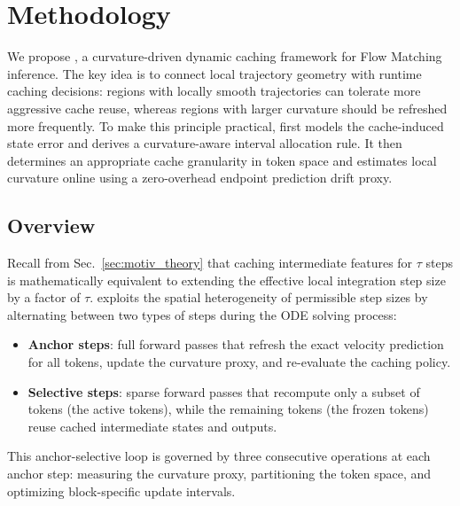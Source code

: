\section{Methodology}
\label{sec:method}

We propose \cubic, a curvature-driven dynamic caching framework for
Flow Matching inference. The key idea is to connect local trajectory
geometry with runtime caching decisions: regions with locally smooth
trajectories can tolerate more aggressive cache reuse, whereas regions
with larger curvature should be refreshed more frequently. To make this
principle practical, \cubic first models the cache-induced state error and
derives a curvature-aware interval allocation rule. It then determines an
appropriate cache granularity in token space and estimates local
curvature online using a zero-overhead endpoint prediction drift proxy.
\subsection{Overview}
\label{sec:method_overview}

Recall from Sec.~\ref{sec:motiv_theory} that caching intermediate features for $\tau$ steps is mathematically equivalent to extending the effective local integration step size by a factor of $\tau$. \cubic exploits the spatial heterogeneity of permissible step sizes by alternating between two types of steps during the ODE solving process:
\begin{itemize}
    \item \textbf{Anchor steps}: full forward passes that refresh the exact velocity prediction for all tokens, update the curvature proxy, and re-evaluate the caching policy.
    \item \textbf{Selective steps}: sparse forward passes that recompute only a subset of tokens (the active tokens), while the remaining tokens (the frozen tokens) reuse cached intermediate states and outputs.
\end{itemize}
This anchor-selective loop is governed by three consecutive operations at each anchor step: measuring the curvature proxy, partitioning the token space, and optimizing block-specific update intervals.


